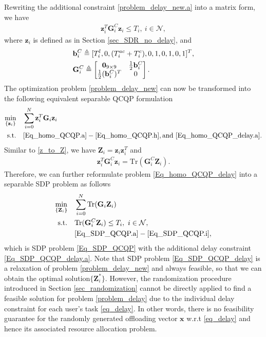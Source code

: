 \documentclass[10pt,journal,compsoc]{IEEEtran}
\begin{document}
{Rewriting the additional constraint \eqref{problem_delay_new.a} into
a matrix form, we have
\begin{align}\label{Eq_homo_QCQP_delay.a}
\mathbf{z}_i^T\mathbf{G}^C_i\mathbf{z}_i\leq T_i,\ i
\in\mathcal{N},
\end{align}
where $\mathbf{z}_i$ is defined as in Section
\ref{sec_SDR_no_delay}, and
\begin{align}
&\mathbf{b}^C_{i}\triangleq[T^l_{i}, 0, (T^{ac}_i+T^c_{i}), 0, 1, 0, 1, 0, 1]^T,\nonumber\allowdisplaybreaks\\
&\mathbf{G}^C_{i}\triangleq
\begin{bmatrix}
\mathbf{0}_{9\times 9}& \frac{1}{2}\mathbf{b}^C_{i}\\
\frac{1}{2}{(\mathbf{b}^C_{i}})^T&0\\
\end{bmatrix}.\nonumber
\end{align}
The optimization problem \eqref{problem_delay_new} can now be transformed
into the following equivalent separable QCQP formulation
\begin{align}%
\min\limits_{\{ \mathbf{z}_i\}}
&\quad \sum_{i=0}^N\mathbf{z}_i^T\mathbf{G}_i\mathbf{z}_i\label{Eq_homo_QCQP_delay}\\
\text{s.t.}
&\quad \eqref{Eq_homo_QCQP.a}-\eqref{Eq_homo_QCQP.h}, \mathrm{and}\ \eqref{Eq_homo_QCQP_delay.a}.\nonumber
\end{align}
Similar to \eqref{z_to_Z}, we have $ \mathbf{Z}_i =
\mathbf{z}_i\mathbf{z}_i^T $ and
\begin{align*}
\mathbf{z}_i^T\mathbf{G}^C_i\mathbf{z}_i=\textrm{Tr}(\mathbf{G}^C_{i}\mathbf{Z}_i).
\end{align*}
Therefore, we can further reformulate problem \eqref{Eq_homo_QCQP_delay} into a
separable SDP problem as follows
\begin{align}
\min\limits_{\{\mathbf{Z}_i\}}
&\quad \sum_{i=0}^N\textrm{Tr}(\mathbf{G}_i\mathbf{Z}_i)\label{Eq_SDP_QCQP_delay}\allowdisplaybreaks\\
\text{s.t.}
&\quad \textrm{Tr}(\mathbf{G}^C_{i}\mathbf{Z}_i)\leq T_i,\ i
\in\mathcal{N},\label{Eq_SDP_QCQP_delay.a}\\
&\quad \eqref{Eq_SDP_QCQP.a}-\eqref{Eq_SDP_QCQP.i},\nonumber
\end{align}
which is SDP problem \eqref{Eq_SDP_QCQP} with the additional delay
constraint \eqref{Eq_SDP_QCQP_delay.a}. Note that SDP problem
\eqref{Eq_SDP_QCQP_delay} is a relaxation of problem
\eqref{problem_delay_new} and always feasible, so that we can obtain
the optimal solution$\{ \mathbf{Z}_i^*\}$. However, the
randomization procedure introduced in Section
\ref{sec_randomization} cannot be directly applied to find a
feasible solution for problem \eqref{problem_delay} due to the
individual delay constraint for each user's task \eqref{eq_delay}.
In other words, there is no feasibility guarantee for the randomly
generated offloading vector $\mathbf{x}$ w.r.t \eqref{eq_delay} and
hence its associated resource allocation problem.

}
\end{document}
